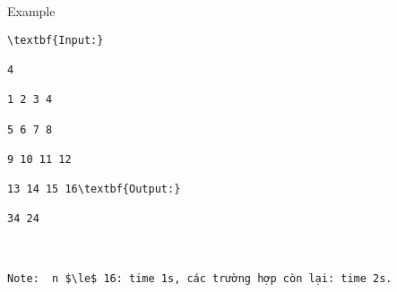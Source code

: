 Example
\begin{verbatim}
\textbf{Input:}

4

1 2 3 4

5 6 7 8

9 10 11 12

13 14 15 16\textbf{Output:}

34 24

 

Note:  n $\le$ 16: time 1s, các trường hợp còn lại: time 2s.\end{verbatim}
